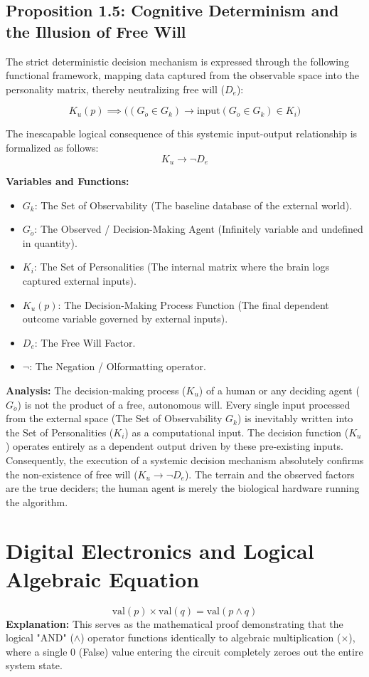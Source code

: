 \documentclass{article}
\begin{document}
\subsection{Proposition 1.5: Cognitive Determinism and the Illusion of Free Will}
The strict deterministic decision mechanism is expressed through the following functional framework, mapping data captured from the observable space into the personality matrix, thereby neutralizing free will ($D_e$):

\[ K_u(p) \implies \Big( (G_{\ddot{o}} \in G_k) \rightarrow \text{input}(G_{\ddot{o}} \in G_k) \in K_i \Big) \]

The inescapable logical consequence of this systemic input-output relationship is formalized as follows:
\[ K_u \rightarrow \neg D_e \]

\textbf{Variables and Functions:}
\begin{itemize}
    \item $G_k$: The Set of Observability (The baseline database of the external world).
    \item $G_{\ddot{o}}$: The Observed / Decision-Making Agent (Infinitely variable and undefined in quantity).
    \item $K_i$: The Set of Personalities (The internal matrix where the brain logs captured external inputs).
    \item $K_u(p)$: The Decision-Making Process Function (The final dependent outcome variable governed by external inputs).
    \item $D_e$: The Free Will Factor.
    \item $\neg$: The Negation / Olformatting operator.
\end{itemize}

\textbf{Analysis:} The decision-making process ($K_u$) of a human or any deciding agent ($G_{\ddot{o}}$) is not the product of a free, autonomous will. Every single input processed from the external space (The Set of Observability $G_k$) is inevitably written into the Set of Personalities ($K_i$) as a computational input. The decision function ($K_u$) operates entirely as a dependent output driven by these pre-existing inputs. Consequently, the execution of a systemic decision mechanism absolutely confirms the non-existence of free will ($K_u \rightarrow \neg D_e$). The terrain and the observed factors are the true deciders; the human agent is merely the biological hardware running the algorithm.

\section{Digital Electronics and Logical Algebraic Equation}
\[ \text{val}(p) \times \text{val}(q) = \text{val}(p \land q) \]
\textbf{Explanation:} This serves as the mathematical proof demonstrating that the logical "AND" ($\land$) operator functions identically to algebraic multiplication ($\times$), where a single 0 (False) value entering the circuit completely zeroes out the entire system state.
\end{document}
